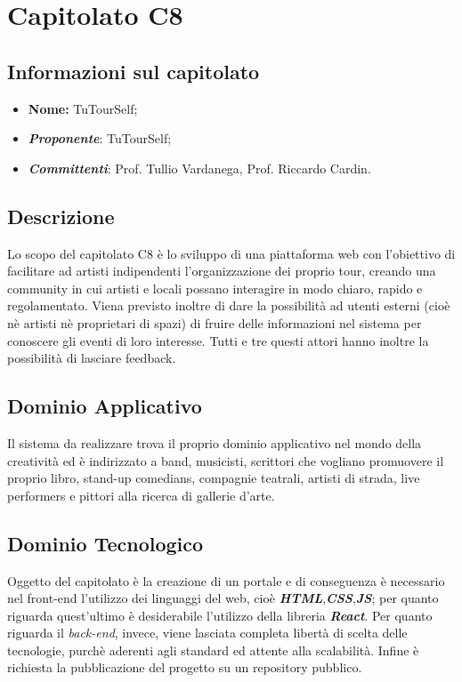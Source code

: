 \section{Capitolato C8}
\subsection{Informazioni sul capitolato}
	\begin{itemize}
		\item \textbf{Nome:}
		 TuTourSelf;
		\item \textbf{\textit{Proponente}}:
		 TuTourSelf;
		\item \textbf{\textit{Committenti}}:
		Prof. Tullio Vardanega, Prof. Riccardo Cardin.
	\end{itemize}

\subsection{Descrizione}
	Lo scopo del capitolato C8 è lo sviluppo di una piattaforma web con l'obiettivo di facilitare ad artisti indipendenti l'organizzazione dei proprio tour, creando una community in cui artisti e locali possano interagire in modo chiaro, rapido e regolamentato. 
	Viena previsto inoltre di dare la possibilità ad utenti esterni (cioè nè artisti nè proprietari di spazi) di fruire delle informazioni nel sistema per conoscere gli eventi di loro interesse. Tutti e tre questi attori hanno inoltre la possibilità di lasciare feedback.
	
\subsection{Dominio Applicativo}
	Il sistema da realizzare trova il proprio dominio applicativo nel mondo della creatività ed è indirizzato a band, musicisti, scrittori che vogliano promuovere
	il proprio libro, stand-up comedians, compagnie teatrali, artisti di strada, live
	performers e pittori alla ricerca di gallerie d’arte.

\subsection{Dominio Tecnologico}
	Oggetto del capitolato è la creazione di un portale e di conseguenza è necessario nel front-end l'utilizzo dei linguaggi del web, cioè \textit{\textbf{HTML}},\textit{\textbf{CSS}},\textit{\textbf{JS}}; per quanto riguarda quest'ultimo è desiderabile l'utilizzo della libreria \textit{\textbf{React}}. Per quanto riguarda il \textit{back-end}, invece, viene lasciata completa libertà di scelta delle tecnologie, purchè aderenti agli standard ed attente alla scalabilità.
	Infine è richiesta la pubblicazione del progetto su un repository pubblico.

